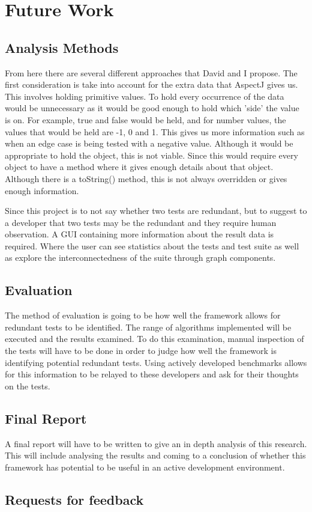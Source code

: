\chapter{Future Work}\label{C:future}

\section{Analysis Methods}
From here there are several different approaches that David and I propose. The first consideration is take into account for the extra data that AspectJ gives us. This involves holding primitive values. To hold every occurrence of the data would be unnecessary as it would be good enough to hold which 'side' the value is on. For example, true and false would be held, and for number values, the values that would be held are -1, 0 and 1. This gives us more information such as when an edge case is being tested with a negative value. Although it would be appropriate to hold the object, this is not viable. Since this would require every object to have a method where it gives enough details about that object. Although there is a toString() method, this is not always overridden or gives enough information.

Since this project is to not say whether two tests are redundant, but to suggest to a developer that two tests may be the redundant and they require human observation. A GUI containing more information about the result data is required. Where the user can see statistics about the tests and test suite as well as explore the interconnectedness of the suite through graph components.

\section{Evaluation}
The method of evaluation is going to be how well the framework allows for redundant tests to be identified. The range of algorithms implemented will be executed and the results examined. To do this examination, manual inspection of the tests will have to be done in order to judge how well the framework is identifying potential redundant tests. Using actively developed benchmarks allows for this information to be relayed to these developers and ask for their thoughts on the tests.

\section{Final Report}
A final report will have to be written to give an in depth analysis of this research. This will include analysing the results and coming to a conclusion of whether this framework has potential to be useful in an active development environment. 

\section{Requests for feedback}

